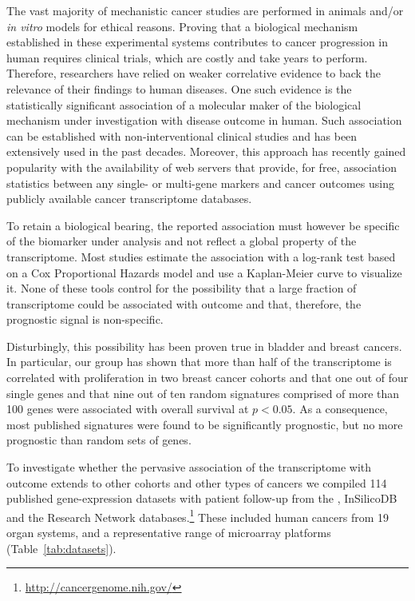 The vast majority of mechanistic cancer studies are performed in animals and/or
\emph{in vitro} models for ethical reasons.  Proving that a biological mechanism
established in these experimental systems contributes to cancer progression in
human requires clinical trials, which are costly and take years to perform.
Therefore, researchers have relied on weaker correlative evidence to back the
relevance of their findings to human diseases.  One such evidence is the
statistically significant association of a molecular maker of the biological
mechanism under investigation with disease outcome in human.  Such association
can be established with non-interventional clinical studies and has been
extensively used in the past decades.  Moreover, this approach has recently
gained popularity with the availability of web
servers\cite{gyorffy_online_2010,ringner_gobo:_2011,gyorffy_online_2013} that
provide, for free, association statistics between any single- or multi-gene
markers and cancer outcomes using publicly available cancer transcriptome
databases.

To retain a biological bearing, the reported association must however be
specific of the biomarker under analysis and not reflect a global property of
the transcriptome.  Most studies estimate the association with a log-rank test
based on a Cox Proportional Hazards model and use a Kaplan-Meier curve to
visualize it.  None of these tools control for the possibility that a large
fraction of transcriptome could be associated with outcome and that, therefore,
the prognostic signal is non-specific.

Disturbingly, this possibility has been proven true in
bladder\cite{lauss_prediction_2010} and
breast\cite{ein-dor_outcome_2005,mosley_cell_2008,venet_most_2011} cancers.  In
particular, our group has shown\cite{venet_most_2011} that more than half of the
transcriptome is correlated with proliferation in two breast cancer cohorts and
that one out of four single genes and that nine out of ten random signatures
comprised of more than 100 genes were associated with overall survival at
$p<0.05$.  As a consequence, most published signatures were found to be
significantly prognostic, but no more prognostic than random sets of genes.

To investigate whether the pervasive association of the transcriptome with
outcome extends to other cohorts and other types of cancers we compiled 114
published gene-expression datasets with patient follow-up from the
\cite{edgar_gene_2002}, InSilicoDB\cite{coletta_insilico_2012}
and the  Research Network
databases.\footnote{\href{http://cancergenome.nih.gov/}{http://cancergenome.nih.gov/}}
These included human cancers from 19 organ systems, and a representative range
of microarray platforms (Table~\ref{tab:datasets}).

